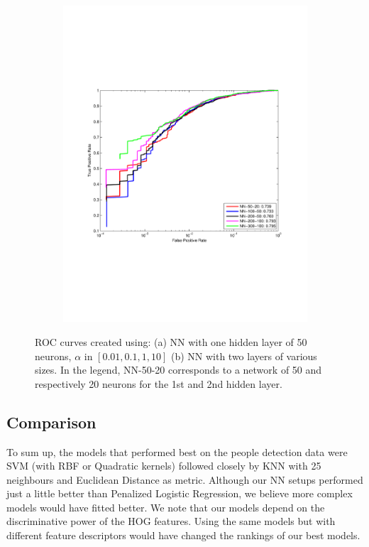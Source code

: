 \begin{figure}[h]
\begin{subfigure}[b]{0.49\textwidth}
    \includegraphics[width=\textwidth]{figures/NN-2layers.pdf}
    \caption{}
    \label{fig:NNb}
  \end{subfigure}
  \caption{ROC curves created using: (a) NN with one hidden layer of 50 neurons, $\alpha$ in $[0.01,0.1,1,10]$ (b) NN with two layers of various sizes. In the legend, NN-50-20 corresponds to a network of 50 and respectively 20  neurons for the 1st and 2nd hidden layer.}
\end{figure}

\subsection{Comparison}
To sum up, the models that performed best on the people detection data were SVM (with RBF or Quadratic kernels) followed closely by KNN with 25 neighbours and Euclidean Distance as metric. Although our NN setups performed just a little better than Penalized Logistic Regression, we believe more complex models would have fitted better. 
We note that our models depend on the discriminative power of the HOG features. Using the same models but with different feature descriptors would have changed the rankings of our best models. 
